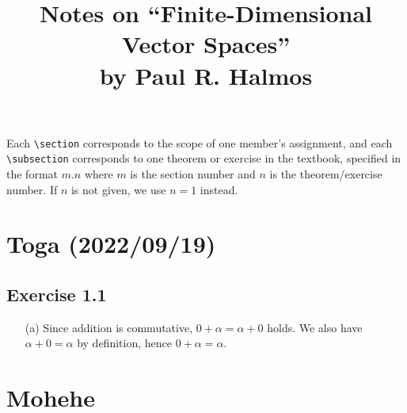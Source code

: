 \documentclass{article}
\title{Notes on ``Finite-Dimensional Vector Spaces''\\by Paul R. Halmos}
\author{}
\begin{document}
\maketitle
Each \verb|\section| corresponds to the scope of one member's assignment,
and each \verb|\subsection| corresponds to one theorem or exercise in the textbook,
specified in the format $m.n$
where $m$ is the section number and $n$ is the theorem/exercise number.
If $n$ is not given, we use $n = 1$ instead.
\section{Toga (2022/09/19)}
\subsection{Exercise 1.1}
\begin{itemize}
  \item[(a)] Since addition is commutative, $0 + \alpha = \alpha + 0$ holds.
    We also have $\alpha + 0 = \alpha$ by definition,
    hence $0 + \alpha = \alpha$.
\end{itemize}
\section{Mohehe}
\end{document}
